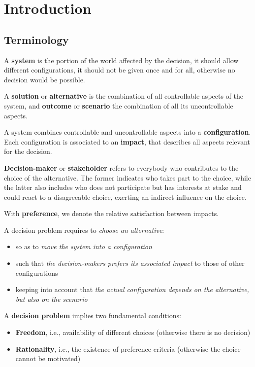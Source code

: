 \chapter{Introduction}
\label{ch:intro}

\section{Terminology}
\label{sec:terminology}

A \textbf{system} is the portion of the world affected by the decision, it should allow different configurations, it should not be given once and for all, otherwise no decision would be possible. 

A \textbf{solution} or \textbf{alternative} is the combination of all controllable aspects of the system, and \textbf{outcome} or \textbf{scenario} the combination of all its uncontrollable aspects. 

A system combines controllable and uncontrollable aspects into a \textbf{configuration}. Each configuration is associated to an \textbf{impact}, that describes all aspects relevant for the decision.

\textbf{Decision-maker} or \textbf{stakeholder} refers to everybody who contributes to the choice of the alternative. The former indicates who takes part to the choice, while the latter also includes who does not participate but has interests at stake and could react to a disagreeable choice, exerting an indirect influence on the choice. 

With \textbf{preference}, we denote the relative satisfaction between impacts. 

A decision problem requires to \textit{choose an alternative}: 
\begin{itemize}
	\item so as to \textit{move the system into a configuration} 
	
	\item such that \textit{the decision-makers prefers its associated impact} to those of other configurations
	
	\item keeping into account that \textit{the actual configuration depends on the alternative, but also on the scenario}
\end{itemize}

A \textbf{decision problem} implies two fundamental conditions: 
\begin{itemize}
	\item \textbf{Freedom}, i.e., availability of different choices (otherwise there is no decision)
	
	\item \textbf{Rationality}, i.e., the existence of preference criteria (otherwise the choice cannot be motivated)
\end{itemize}

